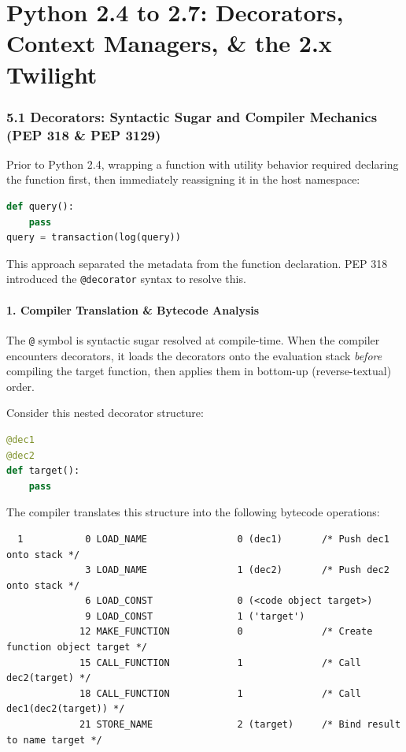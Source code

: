 \hypertarget{python-2.4-to-2.7-decorators-context-managers-the-2.x-twilight}{%
\chapter{Python 2.4 to 2.7: Decorators, Context Managers, \& the 2.x
Twilight}\label{python-2.4-to-2.7-decorators-context-managers-the-2.x-twilight}}

\hypertarget{decorators-syntactic-sugar-and-compiler-mechanics-pep-318-pep-3129}{%
\subsection{5.1 Decorators: Syntactic Sugar and Compiler Mechanics (PEP
318 \& PEP
3129)}\label{decorators-syntactic-sugar-and-compiler-mechanics-pep-318-pep-3129}}

Prior to Python 2.4, wrapping a function with utility behavior required
declaring the function first, then immediately reassigning it in the
host namespace:

\begin{lstlisting}[language=Python]
def query():
    pass
query = transaction(log(query))
\end{lstlisting}

This approach separated the metadata from the function declaration. PEP
318 introduced the \passthrough{\lstinline!@decorator!} syntax to
resolve this.

\hypertarget{compiler-translation-bytecode-analysis}{%
\subsubsection{1. Compiler Translation \& Bytecode
Analysis}\label{compiler-translation-bytecode-analysis}}

The \passthrough{\lstinline!@!} symbol is syntactic sugar resolved at
compile-time. When the compiler encounters decorators, it loads the
decorators onto the evaluation stack \emph{before} compiling the target
function, then applies them in bottom-up (reverse-textual) order.

Consider this nested decorator structure:

\begin{lstlisting}[language=Python]
@dec1
@dec2
def target():
    pass
\end{lstlisting}

The compiler translates this structure into the following bytecode
operations:

\begin{lstlisting}
  1           0 LOAD_NAME                0 (dec1)       /* Push dec1 onto stack */
              3 LOAD_NAME                1 (dec2)       /* Push dec2 onto stack */
              6 LOAD_CONST               0 (<code object target>)
              9 LOAD_CONST               1 ('target')
             12 MAKE_FUNCTION            0              /* Create function object target */
             15 CALL_FUNCTION            1              /* Call dec2(target) */
             18 CALL_FUNCTION            1              /* Call dec1(dec2(target)) */
             21 STORE_NAME               2 (target)     /* Bind result to name target */
\end{lstlisting}

